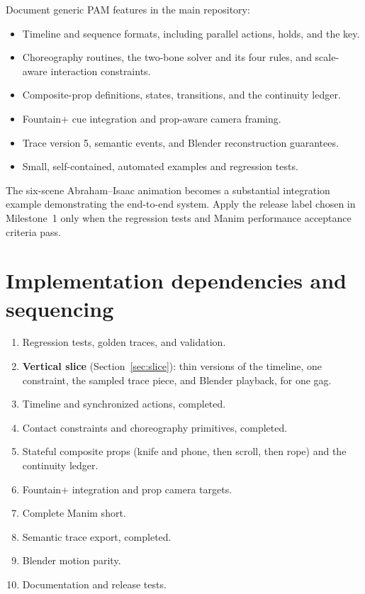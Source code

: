 \documentclass[12pt,letterpaper]{article}
\newcommand{\file}[1]{\texttt{\detokenize{#1}}}
\begin{document}
Document generic PAM features in the main repository:
\begin{itemize}
\item Timeline and sequence formats, including parallel actions, holds, and the \file{frames} key.
\item Choreography routines, the two-bone solver and its four rules, and scale-aware interaction constraints.
\item Composite-prop definitions, states, transitions, and the continuity ledger.
\item Fountain+ cue integration and prop-aware camera framing.
\item Trace version 5, semantic events, and Blender reconstruction guarantees.
\item Small, self-contained, automated examples and regression tests.
\end{itemize}

The six-scene Abraham--Isaac animation becomes a substantial integration example demonstrating the end-to-end system. Apply the release label chosen in Milestone~1 only when the regression tests and Manim performance acceptance criteria pass.

\section{Implementation dependencies and sequencing}

\begin{enumerate}
\item Regression tests, golden traces, and validation.
\item \textbf{Vertical slice} (Section~\ref{sec:slice}): thin versions of the timeline, one constraint, the sampled trace piece, and Blender playback, for one gag.
\item Timeline and synchronized actions, completed.
\item Contact constraints and choreography primitives, completed.
\item Stateful composite props (knife and phone, then scroll, then rope) and the continuity ledger.
\item Fountain+ integration and prop camera targets.
\item Complete Manim short.
\item Semantic trace export, completed.
\item Blender motion parity.
\item Documentation and release tests.
\end{enumerate}
\end{document}
